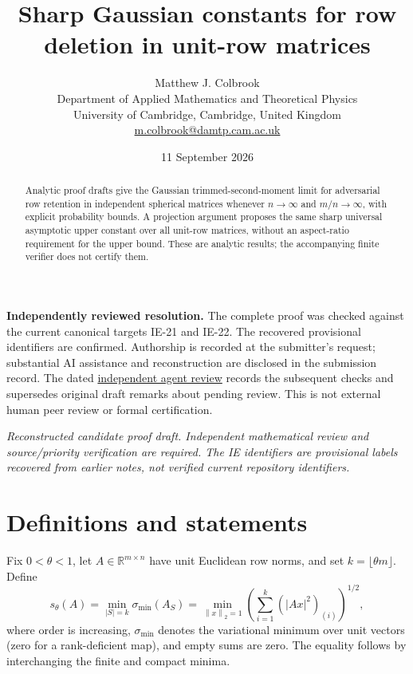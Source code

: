\documentclass[11pt]{article}
\title{Sharp Gaussian constants for row deletion in unit-row matrices}
\author{Matthew J. Colbrook\\\small Department of Applied Mathematics and Theoretical Physics\\\small University of Cambridge, Cambridge, United Kingdom\\\small\href{mailto:m.colbrook@damtp.cam.ac.uk}{m.colbrook@damtp.cam.ac.uk}}
\date{11 September 2026}
\newcommand{\R}{\mathbb R}
\newcommand{\norm}[1]{\left\lVert#1\right\rVert}
\begin{document}
\maketitle

\noindent\textbf{Independently reviewed resolution.} The complete proof was checked against the current canonical targets IE-21 and IE-22. The recovered provisional identifiers are confirmed. Authorship is recorded at the submitter's request; substantial AI assistance and reconstruction are disclosed in the submission record.
The dated \href{https://github.com/MColbrook/OpenProblemsInNLA/blob/codex/colbrook-recovered-submissions/references/colbrook-recovered-2026-09-11/verification/reviews/IE-21-22-review.md}{independent agent review} records the subsequent checks and supersedes original draft remarks about pending review. This is not external human peer review or formal certification.
\par\medskip

\noindent\textit{Reconstructed candidate proof draft. Independent mathematical review and source/priority verification are required. The IE identifiers are provisional labels recovered from earlier notes, not verified current repository identifiers.}


\begin{abstract}
Analytic proof drafts give the Gaussian trimmed-second-moment limit for adversarial row retention in independent spherical matrices whenever $n\to\infty$ and $m/n\to\infty$, with explicit probability bounds. A projection argument proposes the same sharp universal asymptotic upper constant over all unit-row matrices, without an aspect-ratio requirement for the upper bound. These are analytic results; the accompanying finite verifier does not certify them.
\end{abstract}
\section{Definitions and statements}
Fix $0<\theta<1$, let $A\in\R^{m\times n}$ have unit Euclidean row norms, and set $k=\lfloor\theta m\rfloor$. Define
\[
s_\theta(A)=\min_{|S|=k}\sigma_{\min}(A_S)
=\min_{\norm x_2=1}\left(\sum_{i=1}^k(|Ax|^2)_{(i)}\right)^{1/2},
\]
where order is increasing, $\sigma_{\min}$ denotes the variational minimum over unit vectors (zero for a rank-deficient map), and empty sums are zero. The equality follows by interchanging the finite and compact minima.
\end{document}
